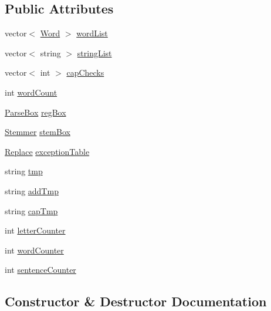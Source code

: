\subsection*{Public Attributes}
\begin{DoxyCompactItemize}
\item 
vector$<$ \hyperlink{class_word}{Word} $>$ \hyperlink{class_word_counts_a4ccb249072e42c130714f34ad3af129e}{word\+List}
\item 
vector$<$ string $>$ \hyperlink{class_word_counts_acb4e201ce0332715a658275d2d420779}{string\+List}
\item 
vector$<$ int $>$ \hyperlink{class_word_counts_ac3a1d95d035b459dbc0e9a9798112335}{cap\+Checks}
\item 
int \hyperlink{class_word_counts_a51250b39ac9e6933d0e00dee01aca54e}{word\+Count}
\item 
\hyperlink{class_parse_box}{Parse\+Box} \hyperlink{class_word_counts_a54e5fcbae4ff8d8521749b7e171abf7c}{reg\+Box}
\item 
\hyperlink{class_stemmer}{Stemmer} \hyperlink{class_word_counts_a8c6a287541197bdcf1c09153aa335ab9}{stem\+Box}
\item 
\hyperlink{class_replace}{Replace} \hyperlink{class_word_counts_aa8db0dbc083698932dc0e4c003689d03}{exception\+Table}
\item 
string \hyperlink{class_word_counts_a2adf908b06afde0655ee4430784cde54}{tmp}
\item 
string \hyperlink{class_word_counts_ab5292fcb0000dc7e5102d05edbcaea42}{add\+Tmp}
\item 
string \hyperlink{class_word_counts_a2642e46ef1143a0659d1a55d8da66990}{cap\+Tmp}
\item 
int \hyperlink{class_word_counts_a4756f25044712a62f517451e18227fd5}{letter\+Counter}
\item 
int \hyperlink{class_word_counts_a2dcad2ace714ce36d0a3b8ab1edf225c}{word\+Counter}
\item 
int \hyperlink{class_word_counts_ae152fd46337b578e77da019ab308d241}{sentence\+Counter}
\end{DoxyCompactItemize}


\subsection{Constructor \& Destructor Documentation}
\mbox{\label{class_word_counts_a8dbf0940fa61399ee96c644785ef5c38}} 
